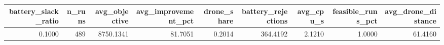 \begin{tabular}{rrrrrrrrr}
\toprule
battery_slack_ratio & n_runs & avg_objective & avg_improvement_pct & drone_share & battery_rejections & avg_cpu_s & feasible_runs_pct & avg_drone_distance \\
\midrule
0.1000 & 489 & 8750.1341 & 81.7051 & 0.2014 & 364.4192 & 2.1210 & 1.0000 & 61.4160 \\
\bottomrule
\end{tabular}
